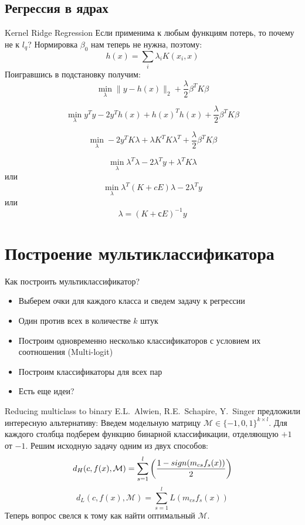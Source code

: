 \documentclass[14pt, fleqn, xcolor={dvipsnames, table}]{beamer}
\begin{document}
\subsection{Регрессия в ядрах}
\begin{frame}{Kernel Ridge Regression}
\small
Если применима к любым функциям потерь, то почему не к $l_q$? Нормировка $\beta_0$ нам теперь не нужна, поэтому:
$$
h(x) = \sum_i \lambda_i K(x_i, x)
$$
Поигравшись в подстановку получим:
$$
\min_\lambda \|y - h(x)\|_2 + \frac{\lambda}{2}\beta^TK\beta
$$

$$
\min_\lambda y^T y - 2 y^T h(x) + h(x)^T h(x) + \frac{\lambda}{2}\beta^TK\beta
$$

$$
\min_\lambda - 2 y^T K \lambda  + \lambda K^T K \lambda^T + \frac{\lambda}{2}\beta^TK\beta
$$

$$
\min_\lambda \lambda^T\lambda - 2 \lambda^T y + \lambda^T K \lambda
$$
или
$$
\min_\lambda \lambda^T (K + cE) \lambda - 2\lambda^T y
$$
или
$$
\lambda = \left(K + с E\right)^{-1}y
$$
\end{frame}

\section{Построение мультиклассификатора} %
\begin{frame}{Как построить мультиклассификатор?}
\begin{itemize}
  \item Выберем очки для каждого класса и сведем задачу к регрессии
  \item Один против всех в количестве $k$ штук
  \item Построим одновременно несколько классификаторов с условием их соотношения (Multi-logit)
  \item Построим классификаторы для всех пар
  \item Есть еще идеи?
\end{itemize}
\end{frame}

\begin{frame}{Reducing multiclass to binary}
\small
E.L.~Alwien, R.E.~Schapire, Y.~Singer предложили интересную альтернативу:
Введем модельную матрицу $\mathcal{M} \in \{-1,0,1\}^{k\times l}$. Для каждого столбца подберем функцию бинарной классификации, отделяющую $+1$ от $-1$.
Решим исходную задачу одним из двух способов:
$$
d_H(c, f(x), \mathcal{M}) = \sum_{s = 1}^l\left({1 - sign(m_{cs} f_s(x)) \over 2}\right)
$$
$$
d_L(c, f(x), \mathcal{M}) = \sum_{s = 1}^l L(m_{cs} f_s(x))
$$
Теперь вопрос свелся к тому как найти оптимальный $\mathcal{M}$.
\end{frame}
\end{document}
